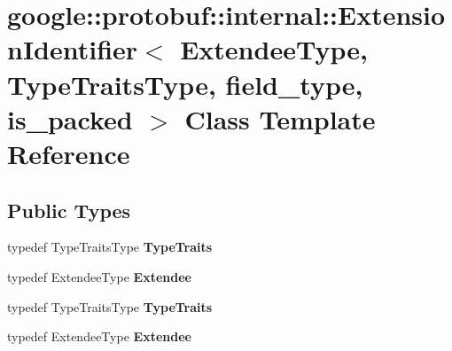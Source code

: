 \hypertarget{classgoogle_1_1protobuf_1_1internal_1_1ExtensionIdentifier}{}\section{google\+:\+:protobuf\+:\+:internal\+:\+:Extension\+Identifier$<$ Extendee\+Type, Type\+Traits\+Type, field\+\_\+type, is\+\_\+packed $>$ Class Template Reference}
\label{classgoogle_1_1protobuf_1_1internal_1_1ExtensionIdentifier}
\subsection*{Public Types}
\begin{DoxyCompactItemize}
\item 
\mbox{\label{classgoogle_1_1protobuf_1_1internal_1_1ExtensionIdentifier_aefcadc7f589f0404038ba094afa96091}} 
typedef Type\+Traits\+Type {\bfseries Type\+Traits}
\item 
\mbox{\label{classgoogle_1_1protobuf_1_1internal_1_1ExtensionIdentifier_ab8c71a9ead147e6a76b69c314d0b4a9a}} 
typedef Extendee\+Type {\bfseries Extendee}
\item 
\mbox{\label{classgoogle_1_1protobuf_1_1internal_1_1ExtensionIdentifier_aefcadc7f589f0404038ba094afa96091}} 
typedef Type\+Traits\+Type {\bfseries Type\+Traits}
\item 
\mbox{\label{classgoogle_1_1protobuf_1_1internal_1_1ExtensionIdentifier_ab8c71a9ead147e6a76b69c314d0b4a9a}} 
typedef Extendee\+Type {\bfseries Extendee}
\end{DoxyCompactItemize}
